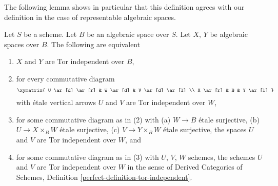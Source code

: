 \noindent
The following lemma shows in particular that this definition agrees
with our definition in the case of representable algebraic spaces.

\begin{lemma}
\label{lemma-tor-independent}
Let $S$ be a scheme. Let $B$ be an algebraic space over $S$.
Let $X$, $Y$ be algebraic spaces over $B$. The following are equivalent
\begin{enumerate}
\item $X$ and $Y$ are Tor independent over $B$,
\item for every commutative diagram
$$
\xymatrix{
U \ar[d] \ar[r] & W \ar[d] & V \ar[d] \ar[l] \\
X \ar[r] & B & Y \ar[l]
}
$$
with \'etale vertical arrows $U$ and $V$ are Tor independent over $W$,
\item for some commutative diagram as in (2) with (a) $W \to B$ \'etale
surjective, (b) $U \to X \times_B W$ \'etale surjective, (c)
$V \to Y \times_B W$ \'etale surjective, the spaces $U$ and $V$ are Tor
independent over $W$, and
\item for some commutative diagram as in (3) with $U$, $V$, $W$ schemes,
the schemes $U$ and $V$ are Tor independent over $W$ in the sense of
Derived Categories of Schemes, Definition
\ref{perfect-definition-tor-independent}.
\end{enumerate}
\end{lemma}

